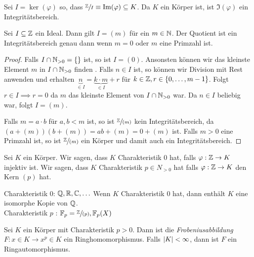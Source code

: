 Sei $I = \ker(\varphi)$ so, dass $\sfrac{\mathbb{Z}}{I} \equiv \Im(\varphi) \subseteq K$.
Da $K$ ein Körper ist, ist $\Im(\varphi)$ ein Integritätsbereich.

\begin{lemma}
	Sei $I \subseteq \mathbb{Z}$ ein Ideal. Dann gilt $I = (m)$ für ein $m \in \mathbb{N}$. 
	Der Quotient ist ein Integritätsbereich genau dann wenn $m = 0$ oder $m$ eine Primzahl ist.
\end{lemma}

\begin{proof}
	Falls $I \cap  \mathbb{N}_{> 0} = \{\} $ ist, so ist $I = (0)$. 
	Ansonsten können wir das kleinste Element $m$ in $I \cap  \mathbb{N}_{> 0}$ finden .
	Falls $n \in I$ ist, so können wir Division mit Rest anwenden und erhalten
	$\underbrace{n}_{\in I} = \underbrace{k \cdot m}_{\in I} + r$ für $k \in \mathbb{Z}, r \in \{0,\ldots,m-1\}$.
	Folgt $r \in I \implies r = 0$ da $m$ das kleinste Element von $I \cap \mathbb{N}_{> 0}$ war.
	Da $n \in I$ beliebig war, folgt $I = (m)$.

	Falls $m = a\cdot b$ für $a,b < m$ ist, so ist $\sfrac{\mathbb{Z}}{(m)}$ kein Integritätsbereich, da $(a+(m))(b+(m)) = ab + (m) = 0 + (m)$  ist.
	Falls $m > 0$ eine Primzahl ist, so ist $\sfrac{\mathbb{Z}}{(m)}$ ein Körper und damit auch ein Integritätsbereich.
\end{proof}

\begin{definition}
	Sei $K$ ein Körper. Wir sagen, dass $K$ Charakteristik $0$ hat, falls $\varphi: \mathbb{Z} \to K$ injektiv ist.
	Wir sagen, dass $K$ Charakteristik $p \in N_{> 0} $ hat falls $\varphi: \mathbb{Z} \to K$ den Kern $(p)$ hat.
\end{definition}

\begin{eg}
	Charakteristik $ 0$: $\mathbb{Q},\mathbb{R},\mathbb{C},\ldots$ 
	Wenn $K$ Charakteristik $0$ hat, dann enthält $K$ eine isomorphe Kopie von $\mathbb{Q}$.\\
	Charakteristik $p$ : $\mathbb{F}_{p} = \sfrac{\mathbb{Z}}{(p)}, \mathbb{F}_{p}(X)$
\end{eg}

\begin{proposition}
	Sei $K$ ein Körper mit Charakteristik $p > 0$.
	Dann ist die \emph{Frobeniusabbildung} $F: x \in K \to x^{p} \in K$ ein Ringhomomorphismus.
	Falls $\abs{K} < \infty$, dann ist $F$ ein Ringautomorphismus.
\end{proposition}

